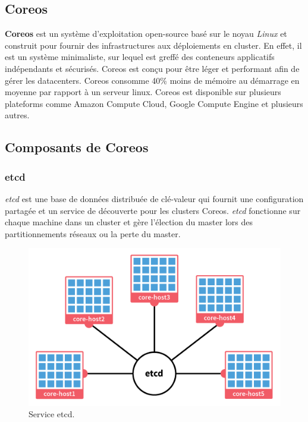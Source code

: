 \begin{onehalfspace}
\section{Coreos}
\textbf{Coreos} est un système d'exploitation open-source basé sur le noyau \emph{Linux} et construit pour fournir des infrastructures aux déploiements en cluster. En effet, il est un système minimaliste, sur lequel est greffé des conteneurs applicatifs indépendants et sécurisés. Coreos est conçu pour être léger et performant afin de gérer les datacenters. Coreos consomme 40\% moins de mémoire au démarrage en moyenne par rapport à un serveur linux. Coreos est disponible sur plusieurs plateforms comme Amazon Compute Cloud, Google Compute Engine et plusieurs autres.
\subsection{Composants de Coreos}
\subsubsection{etcd}
\emph{etcd} est une base de données distribuée de clé-valeur qui fournit une configuration partagée et un service de découverte pour les clusters Coreos. \emph{etcd} fonctionne sur chaque machine dans un cluster et gère l'élection du master lors des partitionnements réseaux ou la perte du master.
\begin{figure}[H]
\centering
\includegraphics [scale=0.4]{chapitre3/assets/etcd-cluster.png}
\caption{Service etcd.}
\end{figure}

\end{onehalfspace}